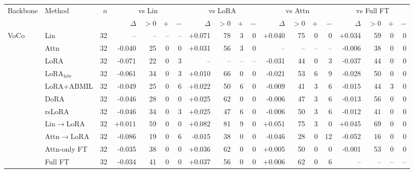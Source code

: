 \setlength{\tabcolsep}{3.5pt}
\begin{tabular}{@{}llrrrrrrrrrrrrrrrrr@{}}
\toprule
Backbone & Method & $n$ & \multicolumn{4}{c}{vs Lin} & \multicolumn{4}{c}{vs LoRA} & \multicolumn{4}{c}{vs Attn} & \multicolumn{4}{c}{vs Full FT} \\
\cmidrule(lr){4-7}\cmidrule(lr){8-11}\cmidrule(lr){12-15}\cmidrule(lr){16-19}
 & & & $\Delta$ & $>0$ & $+$ & $-$ & $\Delta$ & $>0$ & $+$ & $-$ & $\Delta$ & $>0$ & $+$ & $-$ & $\Delta$ & $>0$ & $+$ & $-$ \\
\midrule
VoCo & Lin & 32 & -- & -- & -- & -- & +0.071 & 78 & 3 & 0 & +0.040 & 75 & 0 & 0 & +0.034 & 59 & 0 & 0 \\
 & Attn & 32 & -0.040 & 25 & 0 & 0 & +0.031 & 56 & 3 & 0 & -- & -- & -- & -- & -0.006 & 38 & 0 & 0 \\
 & LoRA & 32 & -0.071 & 22 & 0 & 3 & -- & -- & -- & -- & -0.031 & 44 & 0 & 3 & -0.037 & 44 & 0 & 0 \\
 & LoRA$_{\text{late}}$ & 32 & -0.061 & 34 & 0 & 3 & +0.010 & 66 & 0 & 0 & -0.021 & 53 & 6 & 9 & -0.028 & 50 & 0 & 0 \\
 & LoRA+ABMIL & 32 & -0.049 & 25 & 0 & 6 & +0.022 & 50 & 6 & 0 & -0.009 & 41 & 3 & 6 & -0.015 & 44 & 3 & 0 \\
 & DoRA & 32 & -0.046 & 28 & 0 & 0 & +0.025 & 62 & 0 & 0 & -0.006 & 47 & 3 & 6 & -0.013 & 56 & 0 & 0 \\
 & rsLoRA & 32 & -0.046 & 34 & 0 & 3 & +0.025 & 47 & 6 & 0 & -0.006 & 50 & 3 & 6 & -0.012 & 41 & 0 & 0 \\
 & Lin$\to$LoRA & 32 & +0.011 & 59 & 0 & 0 & +0.082 & 81 & 9 & 0 & +0.051 & 75 & 3 & 0 & +0.045 & 69 & 0 & 0 \\
 & Attn$\to$LoRA & 32 & -0.086 & 19 & 0 & 6 & -0.015 & 38 & 0 & 0 & -0.046 & 28 & 0 & 12 & -0.052 & 16 & 0 & 0 \\
 & Attn-only FT & 32 & -0.035 & 38 & 0 & 0 & +0.036 & 62 & 0 & 0 & +0.005 & 50 & 0 & 0 & -0.001 & 53 & 0 & 0 \\
 & Full FT & 32 & -0.034 & 41 & 0 & 0 & +0.037 & 56 & 0 & 0 & +0.006 & 62 & 0 & 6 & -- & -- & -- & -- \\
\bottomrule
\end{tabular}
